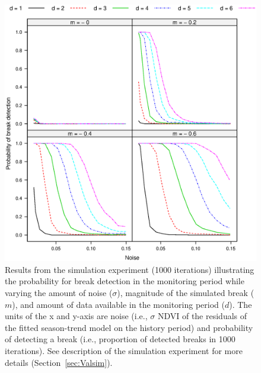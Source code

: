 \documentclass[authoryear,preprint,review,10pt]{elsarticle}
\begin{document}
\begin{figure}[htp]
\centering
    \includegraphics[height=0.9\textwidth]{figs/NrDetections_Time_1000.eps}
  \caption{Results from the simulation experiment (1000 iterations) illustrating the probability for break detection in the monitoring period while varying the amount of noise ($\sigma$), magnitude of the simulated break ($m$), and amount of data  available in the monitoring period ($d$). The units of the x and y-axis are noise (i.e., $\sigma$ NDVI of the residuals of the fitted season-trend model on the history period) and probability of detecting a break (i.e., proportion of detected breaks in 1000 iterations). See description of the simulation experiment for more details (Section~\ref{sec:Valsim}). }
  \label{fig:SimNr}
\end{figure}
\end{document}
